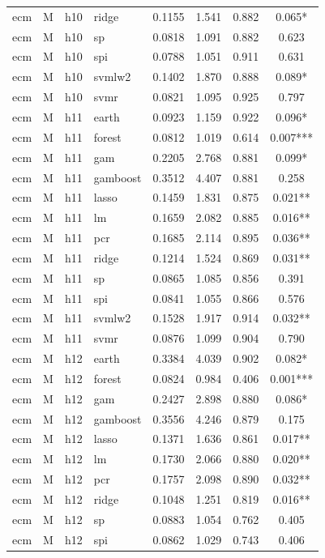 \begin{ThreePartTable}
\begin{longtable}[t]{llclcccc}
ecm & M & h10 & ridge & 0.1155 & 1.541 & 0.882 & 0.065*\\
ecm & M & h10 & sp & 0.0818 & 1.091 & 0.882 & 0.623\\
ecm & M & h10 & spi & 0.0788 & 1.051 & 0.911 & 0.631\\
ecm & M & h10 & svmlw2 & 0.1402 & 1.870 & 0.888 & 0.089*\\
ecm & M & h10 & svmr & 0.0821 & 1.095 & 0.925 & 0.797\\
\addlinespace
ecm & M & h11 & earth & 0.0923 & 1.159 & 0.922 & 0.096*\\
ecm & M & h11 & forest & 0.0812 & 1.019 & 0.614 & 0.007***\\
ecm & M & h11 & gam & 0.2205 & 2.768 & 0.881 & 0.099*\\
ecm & M & h11 & gamboost & 0.3512 & 4.407 & 0.881 & 0.258\\
ecm & M & h11 & lasso & 0.1459 & 1.831 & 0.875 & 0.021**\\
ecm & M & h11 & lm & 0.1659 & 2.082 & 0.885 & 0.016**\\
ecm & M & h11 & pcr & 0.1685 & 2.114 & 0.895 & 0.036**\\
ecm & M & h11 & ridge & 0.1214 & 1.524 & 0.869 & 0.031**\\
ecm & M & h11 & sp & 0.0865 & 1.085 & 0.856 & 0.391\\
ecm & M & h11 & spi & 0.0841 & 1.055 & 0.866 & 0.576\\
ecm & M & h11 & svmlw2 & 0.1528 & 1.917 & 0.914 & 0.032**\\
ecm & M & h11 & svmr & 0.0876 & 1.099 & 0.904 & 0.790\\
\addlinespace
ecm & M & h12 & earth & 0.3384 & 4.039 & 0.902 & 0.082*\\
ecm & M & h12 & forest & 0.0824 & 0.984 & 0.406 & 0.001***\\
ecm & M & h12 & gam & 0.2427 & 2.898 & 0.880 & 0.086*\\
ecm & M & h12 & gamboost & 0.3556 & 4.246 & 0.879 & 0.175\\
ecm & M & h12 & lasso & 0.1371 & 1.636 & 0.861 & 0.017**\\
ecm & M & h12 & lm & 0.1730 & 2.066 & 0.880 & 0.020**\\
ecm & M & h12 & pcr & 0.1757 & 2.098 & 0.890 & 0.032**\\
ecm & M & h12 & ridge & 0.1048 & 1.251 & 0.819 & 0.016**\\
ecm & M & h12 & sp & 0.0883 & 1.054 & 0.762 & 0.405\\
ecm & M & h12 & spi & 0.0862 & 1.029 & 0.743 & 0.406\\

\end{longtable}
\end{ThreePartTable}
